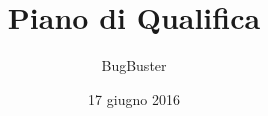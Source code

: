 



\title{\textbf{Piano di Qualifica}}
\author{BugBuster}

\date{17 giugno 2016}




\makeFrontPage

\tableofcontents
\listoffigures
\listoftables





